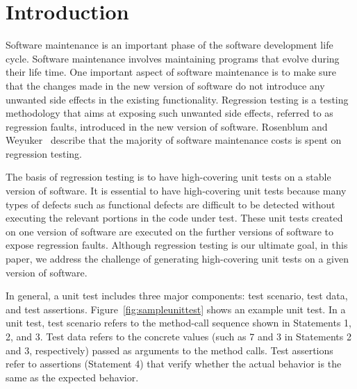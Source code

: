 \section{Introduction}
\label{sec:intro}

Software maintenance is an important phase of the software development life cycle. Software maintenance involves maintaining programs that evolve during their life time. One important aspect of software maintenance is to make sure that the changes made in the new version of software do not introduce any unwanted side effects in the existing functionality. Regression testing is a testing methodology that aims at exposing such unwanted side effects, referred to as regression faults, introduced in the new version of software. Rosenblum and Weyuker~\cite{rosenblum96:regression} describe that the majority of software maintenance costs is spent on regression testing.

The basis of regression testing is to have high-covering unit tests on a stable version of software. It is essential to have high-covering unit tests because many types of defects such as functional defects are difficult to be detected without executing the relevant portions in the code under test. These unit tests created on one version of software are executed on the further versions of software to expose regression faults. Although regression testing is our ultimate goal, in this paper, we address
the challenge of generating high-covering unit tests on a given version of software.

In general, a unit test includes three major components: test scenario, test data, and test assertions. Figure~\ref{fig:sampleunittest} shows an example unit test. In a unit test, test scenario refers to the method-call sequence shown in Statements 1, 2, and 3. Test data refers to the concrete values (such as 7 and 3 in Statements 2 and 3, respectively) passed as arguments to the method calls. Test assertions refer to assertions (Statement 4) that verify whether the actual behavior is the same as the expected behavior.

